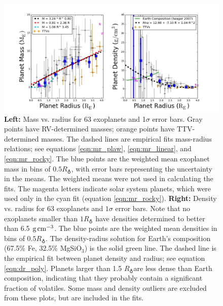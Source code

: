 \documentclass[iop]{emulateapj}
\newcommand{\gcmc}{\ensuremath{\rm g\,cm^{-3}}}
\newcommand{\gcc}{\gcmc}
\newcommand{\rearth}{\ensuremath{R_\earth}}
\begin{document}
\begin{figure}[htbp] %
   \centering
    \includegraphics[width=6in]{mr_small.png} 
   \caption{\small \textbf{Left:} Mass vs. radius for 63 exoplanets and 1$\sigma$ error bars.  Gray points  have RV-determined masses; orange points have TTV-determined masses.  The dashed lines are empirical fits mass-radius relations; see equations \ref{eqn:mr_plaw}, \ref{eqn:mr_linear}, and \ref{eqn:mr_rocky}.  The blue points are the weighted mean exoplanet mass in bins of $0.5 \rearth$, with error bars representing the uncertainty in the means.  The weighted means were not used in calculating the fits.  The magenta letters indicate solar system planets, which were used only in the cyan fit (equation \ref{eqn:mr_rocky}).  \textbf{Right:} Density vs. radius for 63 exoplanets and $1\sigma$ error bars.  Note that no exoplanets smaller than $1\rearth$ have densities determined to better than 6.5 \gcc.  The blue points are the weighted mean densities in bins of $0.5 \rearth$.  The \citet{Seager2007} density-radius solution for Earth's composition (67.5\% Fe, 32.5\% MgSiO$_3$) is the solid green line.  The dashed line is the empirical fit between planet density and radius; see equation \ref{eqn:dr_poly}.  Planets larger than 1.5 \rearth are less dense than Earth composition, indicating that they probably contain a significant fraction of volatiles.  Some mass and density outliers are excluded from these plots, but are included in the fits.}
   \label{fig:rm_4}
\end{figure}
\end{document}
